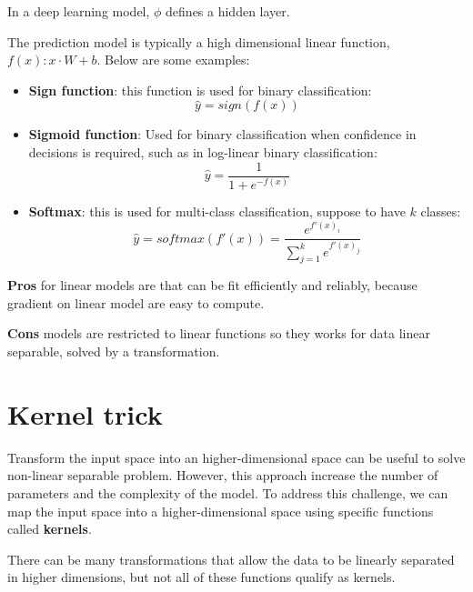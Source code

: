 \begin{note}
    In a deep learning model, $\phi$ defines a hidden layer.
\end{note}

The prediction model is typically a high dimensional linear function, $f(x): x \cdot W + b$.
Below are some examples:
\begin{itemize}
    \item \textbf{Sign function}: this function is used for binary classification:
          \begin{equation}
              \hat{y} = sign(f(x))
          \end{equation}
    \item \textbf{Sigmoid function}: Used for binary classification when confidence
          in decisions is required, such as in log-linear binary classification:
          \begin{equation}
              \hat{y} = \frac{1}{1+e^{-f(x)}}
          \end{equation}
    \item \textbf{Softmax}: this is used for multi-class classification, suppose
          to have $k$ classes:
          \begin{equation}
              \hat{y} = softmax(f'(x)) = \frac{e^{f'(x)_i}}{\sum_{j=1}^k e^{f'(x)_j}}
          \end{equation}
\end{itemize}

\textbf{Pros} for linear models are that can be fit efficiently and reliably, because
gradient on linear model are easy to compute.

\textbf{Cons} models are restricted to linear functions so they works for data linear
separable, solved by a transformation.
\section{Kernel trick}
Transform the input space into an higher-dimensional space can be useful to solve
non-linear separable problem. However, this approach increase the number of
parameters and the complexity of the model. To address this challenge, we can map
the input space into a higher-dimensional space using specific functions called
\textbf{kernels}.

\begin{note}
    There can be many transformations that allow the data to be linearly separated
    in higher dimensions, but not all of these functions qualify as kernels.
\end{note}

